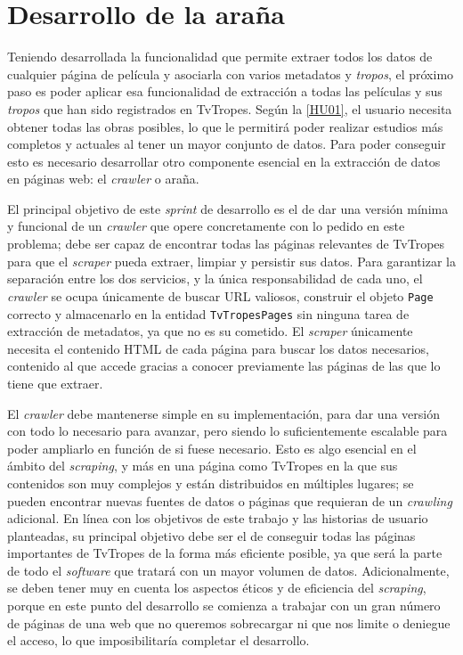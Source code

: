 \section{Desarrollo de la araña}
Teniendo desarrollada la funcionalidad que permite extraer todos los datos
de cualquier página de película y asociarla con varios metadatos y
\textit{tropos}, el próximo paso es poder aplicar esa funcionalidad de
extracción a todas las películas y sus \textit{tropos} que han sido registrados
en TvTropes. Según la
\href{https://github.com/jlgallego99/TropesToGo/issues/6}{[HU01]}, el usuario
necesita obtener todas las obras posibles, lo que le permitirá poder realizar
estudios más completos y actuales al tener un mayor conjunto de datos. Para
poder conseguir esto es necesario desarrollar otro componente esencial en la
extracción de datos en páginas web: el \textit{crawler} o araña.

El principal objetivo de este \textit{sprint} de desarrollo es el de dar una
versión mínima y funcional de un \textit{crawler} que opere concretamente con lo
pedido en este problema; debe ser capaz de encontrar todas las páginas
relevantes de TvTropes para que el \textit{scraper} pueda extraer, limpiar y
persistir sus datos. Para garantizar la separación entre los dos servicios, y la
única responsabilidad de cada uno, el \textit{crawler} se ocupa únicamente de
buscar URL valiosos, construir el objeto \texttt{Page} correcto y almacenarlo
en la entidad \texttt{TvTropesPages} sin ninguna tarea de extracción
de metadatos, ya que no es su cometido. El \textit{scraper} únicamente necesita el
contenido HTML de cada página para buscar los datos necesarios, contenido al que
accede gracias a conocer previamente las páginas de las que lo tiene que
extraer.

El \textit{crawler} debe mantenerse simple en su implementación, para dar una
versión con todo lo necesario para avanzar, pero siendo lo suficientemente
escalable para poder ampliarlo en función de si fuese necesario. Esto es algo
esencial en el ámbito del \textit{scraping}, y más en una página como TvTropes
en la que sus contenidos son muy complejos y están distribuidos en múltiples
lugares; se pueden encontrar nuevas fuentes de datos o páginas que
requieran de un \textit{crawling} adicional. En línea con los objetivos de este
trabajo y las historias de usuario planteadas, su principal objetivo debe ser el
de conseguir todas las páginas importantes de TvTropes de la forma más eficiente
posible, ya que será la parte de todo el \textit{software} que tratará con un
mayor volumen de datos. Adicionalmente, se deben tener muy en cuenta los
aspectos éticos y de eficiencia del \textit{scraping}, porque en este punto del
desarrollo se comienza a trabajar con un gran número de páginas de una web que
no queremos sobrecargar ni que nos limite o deniegue el acceso, lo que
imposibilitaría completar el desarrollo.

